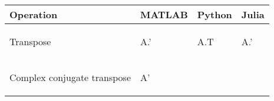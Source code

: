 \documentclass[10pt, landscape]{article}
\newenvironment{Shaded}{}{}
\newcommand{\NormalTok}[1]{{#1}}
\begin{document}
\begin{multicols*}{2}
\begin{tabular}[ ]{@{}llll@{}}
\toprule
\begin{minipage}[b]{0.24\columnwidth}\raggedright\strut
Operation\strut
\end{minipage} & \begin{minipage}[b]{0.23\columnwidth}\raggedright\strut
MATLAB\strut
\end{minipage} & \begin{minipage}[b]{0.20\columnwidth}\raggedright\strut
Python\strut
\end{minipage} & \begin{minipage}[b]{0.20\columnwidth}\raggedright\strut
Julia\strut
\end{minipage}\tabularnewline
\midrule
\begin{minipage}[t]{0.24\columnwidth}\raggedright\strut
Transpose\strut
\end{minipage} & \begin{minipage}[t]{0.23\columnwidth}\raggedright\strut
\begin{Shaded}
\begin{Highlighting}[]
\NormalTok{A.'}
\end{Highlighting}
\end{Shaded}
\strut
\end{minipage} & \begin{minipage}[t]{0.20\columnwidth}\raggedright\strut
\begin{Shaded}
\begin{Highlighting}[]
\NormalTok{A.T}
\end{Highlighting}
\end{Shaded}
\strut
\end{minipage} & \begin{minipage}[t]{0.20\columnwidth}\raggedright\strut
\begin{Shaded}
\begin{Highlighting}[]
\NormalTok{A.'}
\end{Highlighting}
\end{Shaded}
\strut
\end{minipage}\tabularnewline
\begin{minipage}[t]{0.24\columnwidth}\raggedright\strut
Complex conjugate transpose\strut
\end{minipage} & \begin{minipage}[t]{0.23\columnwidth}\raggedright\strut
\begin{Shaded}
\begin{Highlighting}[]
\NormalTok{A'}
\end{Highlighting}

\end{Shaded}
\end{minipage}
\end{tabular}
\end{multicols*}
\end{document}
